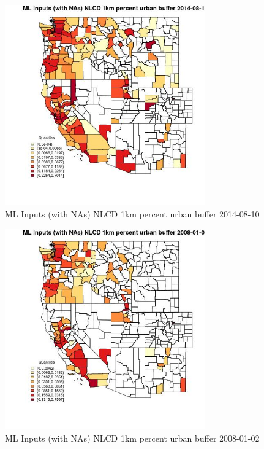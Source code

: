 \begin{figure} 
\centering  
\includegraphics[width=0.77\textwidth]{Code_Outputs/Report_ML_input_PM25_Step4_part_e_de_duplicated_aves_compiled_2019-05-18wNAs_CountyNLCD_1km_percent_urban_bufferMean2014-08-10_2014-08-10.jpg} 
\caption{\label{fig:Report_ML_input_PM25_Step4_part_e_de_duplicated_aves_compiled_2019-05-18wNAsCountyNLCD_1km_percent_urban_bufferMean2014-08-10_2014-08-10}ML Inputs (with NAs) NLCD 1km percent urban buffer 2014-08-10} 
\end{figure} 
 

\begin{figure} 
\centering  
\includegraphics[width=0.77\textwidth]{Code_Outputs/Report_ML_input_PM25_Step4_part_e_de_duplicated_aves_compiled_2019-05-18wNAs_CountyNLCD_1km_percent_urban_bufferMean2008-01-02_2008-01-02.jpg} 
\caption{\label{fig:Report_ML_input_PM25_Step4_part_e_de_duplicated_aves_compiled_2019-05-18wNAsCountyNLCD_1km_percent_urban_bufferMean2008-01-02_2008-01-02}ML Inputs (with NAs) NLCD 1km percent urban buffer 2008-01-02} 
\end{figure} 
 


